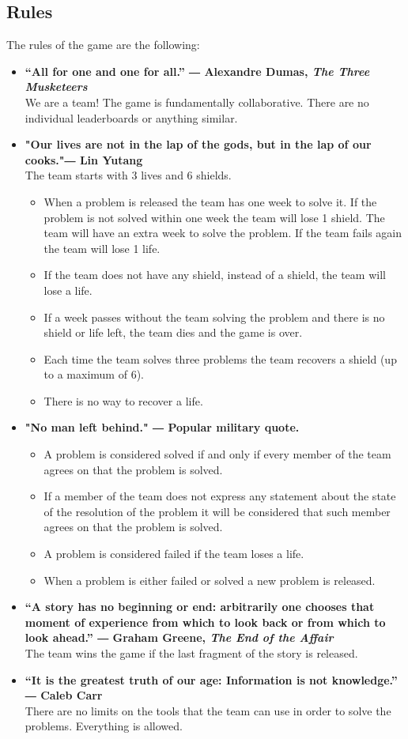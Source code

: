 \documentclass[english,11pt]{article}
\theoremstyle{definition}
\theoremstyle{plain}
\begin{document}
\subsection*{Rules}
The rules of the game are the following:
\begin{itemize}
\item \textbf{“All for one and one for all.” 
― Alexandre Dumas, \textit{The Three Musketeers}} \\We are a team! The game is fundamentally collaborative. There are no individual leaderboards or anything similar.
\item \textbf{"Our lives are not in the lap of the gods, but in the lap of our cooks."― Lin Yutang} \\
The team starts with 3 lives and 6 shields.
\begin{itemize}
\item  When a problem is released the team has one week to solve it. If the problem is not solved within one week the team will lose 1 shield. The team will have an extra week to solve the problem. If the team fails again the team will lose 1 life. 
\item If the team does not have any shield, instead of a shield, the team will lose a life.
\item If a week passes without the team solving the problem and there is no shield or life left, the team dies and the game is over.
\item Each time the team solves three problems the team recovers a shield (up to a maximum of 6).
\item There is no way to recover a life.
\end{itemize}
\item \textbf{"No man left behind." ― Popular military quote.}\\
\begin{itemize}

 \item A problem is considered solved if and only if every member of the team agrees on that the problem is solved. 
 \item If a member of the team does not express any statement about the state of the resolution of the problem it will be considered that such member agrees on that the problem is solved.
 \item A problem is considered failed if the team loses a life.
 \item When a problem is either failed or solved a new problem is released.
\end{itemize}
\item \textbf{“A story has no beginning or end: arbitrarily one chooses that moment of experience from which to look back or from which to look ahead.” 
― Graham Greene, \textit{The End of the Affair}}
\\
The team wins the game if the last fragment of the story is released.
\item \textbf{“It is the greatest truth of our age: Information is not knowledge.” 
― Caleb Carr } \\
There are no limits on the tools that the team can use in order to solve the problems. Everything is allowed.
\end{itemize}
\end{document}
